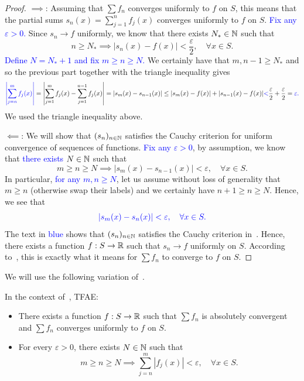 \begin{proof}
	$\implies$: Assuming that $\sum f_n$ converges uniformly to $f$ on $S$, this means that the partial sums $s_n(x) = \sum_{j=1}^nf_j(x)$ converges uniformly to $f$ on $S$. \textcolor{blue}{Fix any $\varepsilon>0$.} Since $s_n\to f$ uniformly, we know that there exists $N_*\in\mathbb{N}$ such that
	\[
	n \ge N_* \implies |s_n(x) - f(x)|<\frac{\varepsilon}{2},\quad \forall x \in S.
	\]
	\textcolor{blue}{Define $N = N_*+1$ and fix $m\ge n\ge N$.} We certainly have that $m,n-1 \ge N_*$ and so the previous part together with the triangle inequality gives
	\[
	\textcolor{blue}{\left|\sum_{j=n}^mf_j(x)\right|} = \left|\sum_{j=1}^mf_j(x) - \sum_{j=1}^{n-1}f_j(x)\right| = |s_m(x) - s_{n-1}(x)| \le |s_m(x) - f(x)| + |s_{n-1}(x) - f(x)| \textcolor{blue}{<}\frac{\varepsilon}{2} + \frac{\varepsilon}{2} = \textcolor{blue}{\varepsilon.}
	\]
	We used the triangle inequality above.
	
	$\impliedby$: We will show that $(s_n)_{n\in\mathbb{N}}$ satisfies the Cauchy criterion for uniform convergence of sequences of functions. \textcolor{blue}{Fix any $\varepsilon>0$}, by assumption, we know that \textcolor{blue}{there exists $N\in \mathbb{N}$} such that
	\[
	m\ge n\ge N\implies |s_m(x) - s_{n-1}(x)|<\varepsilon,\quad \forall x \in S.
	\]
	In particular, \textcolor{blue}{for any $m,n\ge N$}, let us assume without loss of generality that $m\ge n$ (otherwise swap their labels) and we certainly have $n+1 \ge n \ge N$. Hence, we see that
	\[
	\textcolor{blue}{|s_m(x)-s_n(x)|<\varepsilon,\quad \forall x \in S.}
	\]
	The text in \textcolor{blue}{blue} shows that $(s_n)_{n\in\mathbb{N}}$ satisfies the Cauchy criterion in~. Hence, there exists a function $f:S\to \mathbb{R}$ such that $s_n\to f$ uniformly on $S$. According to~, this is exactly what it means for $\sum f_n$ to converge to $f$ on $S$.
\end{proof}
We will use the following variation of~.
\begin{ex}
	\label{ex:unif_abs_series}
	In the context of~, TFAE:
	\begin{itemize}
		\item There exists a function $f:S\to \mathbb{R}$ such that $\sum f_n$ is absolutely convergent and $\sum f_n$ converges uniformly to $f$ on $S$.
		\item For every $\varepsilon>0$, there exists $N\in\mathbb{N}$ such that
		\[
		m\ge n \ge N\implies \sum_{j=n}^m |f_j(x)| < \varepsilon,\quad \forall x\in S.
		\]
	\end{itemize}
\end{ex}
